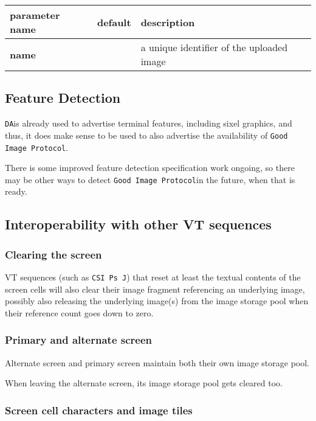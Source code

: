 \documentclass[a4paper]{article}
\newcommand{\code}[1]{\colorbox{light-gray}{\texttt{#1}}}
\newcommand{\DA}{\code{DA}}
\newcommand{\GoodImageProtocol}{\code{Good Image Protocol}}
\begin{document}
\begin{tabular}{|l|l|l|}
    \hline
    \textbf{parameter name} & \textbf{default} & \textbf{description} \\
    \hline
    \textbf{name}       & & a unique identifier of the uploaded image \\
    \hline
\end{tabular}

\subsection{Feature Detection}

\DA is already used to advertise terminal features, including sixel graphics, and thus,
it does make sense to be used to also advertise the availability of \GoodImageProtocol.

There is some improved feature detection specification work ongoing,
so there may be other ways to detect \GoodImageProtocol in the future, when that is ready.

\subsection{Interoperability with other VT sequences}

\subsubsection*{Clearing the screen}

VT sequences (such as \code{CSI Ps J}) that reset at least the textual contents of the screen cells will also
clear their image fragment referencing an underlying image, possibly also releasing the
underlying image(s) from the image storage pool when their reference count goes down to zero.

\subsubsection*{Primary and alternate screen}

Alternate screen and primary screen maintain both their own image storage pool.

When leaving the alternate screen, its image storage pool gets cleared too.

\subsubsection*{Screen cell characters and image tiles}
\end{document}
